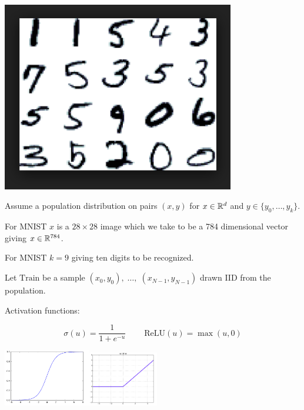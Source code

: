 {\vfill
\centerline{\includegraphics[width= 4.0in]{../images/MNIST}}
  

Assume a population distribution on pairs $(x,y)$ for $x \in \mathbb{R}^d$ and $y \in \{y_0,\ldots, y_k\}$.

\vfill
For MNIST $x$ is a $28 \times 28$ image which we take to be a 784 dimensional vector giving $x \in \mathbb{R}^{784}$.

\vfill
For MNIST $k = 9$ giving ten digits to be recognized.

\vfill
Let $\mathrm{Train}$ be a sample $(x_0,y_0),\;\ldots,\;(x_{N-1},y_{N-1})$ drawn IID from the population.


Activation functions:

\vfill
$$\sigma(u) = \frac{1}{1+e^{-u}}\;\;\;\;\;\;\;\;\mathrm{ReLU}(u) = \max(u,0)$$

\vfill
\centerline{\includegraphics[width=1.5in]{../images/sigmoid}\hspace{1.0in}\includegraphics[width=1.2in]{../images/relu}}


}
